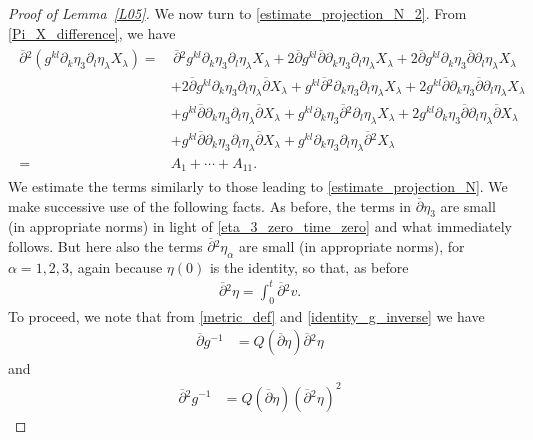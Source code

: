 \documentclass[10pt,reqno]{amsart}
\theoremstyle{plain}
\theoremstyle{definition}
\numberwithin{equation}{section}
\newcommand{\al}{\alpha}
\newcommand{\la}{\lambda}
\begin{document}
{{{\begin{proof}[Proof of Lemma~\ref{L05}]
We now turn to \eqref{estimate_projection_N_2}. From \eqref{Pi_X_difference}, we have
\begin{align}
\begin{split}
\overline{\partial}{}^2 (g^{kl} \partial_k \eta_3 \partial_l \eta_\la X_\la )
= &
\,
\overline{\partial}{}^2 g^{kl} \partial_k \eta_3 \partial_l \eta_\la X_\la 
+
2 \overline{\partial} g^{kl} \overline{\partial} \partial_k \eta_3 \partial_l \eta_\la X_\la 
+
2 \overline{\partial} g^{kl} \partial_k \eta_3 \overline{\partial}\partial_l \eta_\la X_\la 
\\
& 
+
2 \overline{\partial} g^{kl} \partial_k \eta_3 \partial_l  \eta_\la \overline{\partial} X_\la 
+
g^{kl} \overline{\partial}{}^2 \partial_k \eta_3 \partial_l \eta_\la X_\la 
+
2 g^{kl} \overline{\partial} \partial_k \eta_3 \overline{\partial} \partial_l \eta_\la X_\la 
\\
& 
+
g^{kl} \overline{\partial} \partial_k \eta_3 \partial_l \eta_\la \overline{\partial} X_\la 
+
g^{kl} \partial_k \eta_3 \overline{\partial}{}^2 \partial_l \eta_\la X_\la 
+
2 g^{kl} \partial_k \eta_3 \overline{\partial}\partial_l \eta_\la \overline{\partial} X_\la 
\\
&
+
g^{kl} \overline{\partial} \partial_k \eta_3 \partial_l \eta_\la \overline{\partial} X_\la 
+
g^{kl} \partial_k \eta_3 \partial_l \eta_\la \overline{\partial}{}^2 X_\la 
\\
 = &A_1 + \cdots +  A_{11}.
\end{split}
\nonumber
\end{align}
We estimate the terms similarly to those leading to \eqref{estimate_projection_N}.
We  make successive use of the following facts.
As before, the terms in $\overline{\partial} \eta_3$ are small (in appropriate norms) 
in light of \eqref{eta_3_zero_time_zero} and what immediately follows.
 But here also the terms $\overline{\partial}{}^2 \eta_\al$ 
are small (in appropriate norms), for $\al=1,2,3$, again because $\eta(0)$ is the identity, so that, 
as before
\begin{gather}
\overline{\partial}{}^2 \eta = \int_0^t \overline{\partial}{}^2 v.
\nonumber
\end{gather}
To proceed, we note
that from \eqref{metric_def} and \eqref{identity_g_inverse} we have
\begin{align}
\overline{\partial} g^{-1} & = Q(\overline{\partial} \eta) \overline{\partial}{}^2 \eta
\nonumber
\end{align}
and
\begin{align}
\overline{\partial}{}^2 g^{-1} & = Q(\overline{\partial} \eta) (\overline{\partial}{}^2 \eta)^2

\end{align}
\end{proof}}}}
\end{document}
